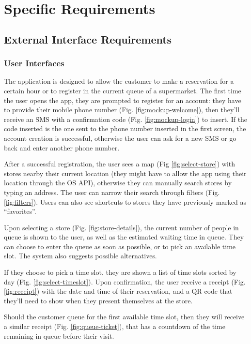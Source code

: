 
\section{Specific Requirements}\label{sec:spec_req}

\subsection{External Interface Requirements}
\subsubsection{User Interfaces}

The application is designed to allow the customer to make a reservation for a certain hour or to register in the current queue of a supermarket. The first time the user opens the app, they are prompted to register for an account: they have to provide their mobile phone number
(Fig. \ref{fig:mockup-welcome}), then they'll receive an SMS with a confirmation code
(Fig. \ref{fig:mockup-login}) to insert.
If the code inserted is the one sent to the phone number inserted in the first screen, the account creation is successful, otherwise the user can ask for a new SMS or go back and enter another phone number.

After a successful registration, the user sees a map (Fig \ref{fig:select-store}) with stores nearby their current location (they might have to allow the app using their location through the OS API), otherwise they can manually search stores by typing an address. The user can narrow their search through filters (Fig. \ref{fig:filters}).
Users can also see shortcuts to stores they have previously marked as ``favorites''.

Upon selecting a store (Fig. \ref{fig:store-details}), the current number of people in queue is shown to the user,
as well as the estimated waiting time in queue. They can choose to enter the queue as soon as possible, or to pick an available time slot. The system also suggests possible alternatives.

If they choose to pick a time slot, they are shown a list of time slots sorted by day (Fig. \ref{fig:select-timeslot}).
Upon confirmation, the user receive a receipt (Fig. \ref{fig:receipt}) with the date and time of their reservation,
and a QR code that they'll need to show when they present themselves at the store.

Should the customer queue for the first available time slot, then they will receive a similar receipt (Fig. \ref{fig:queue-ticket}),
that has a countdown of the time remaining in queue before their visit.

